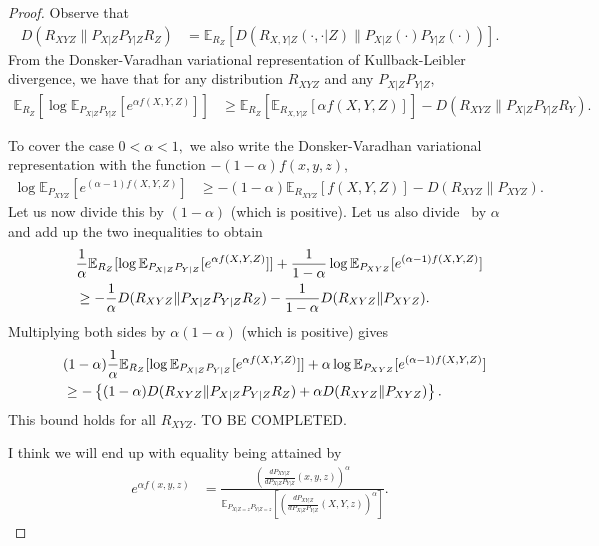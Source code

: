 \documentclass{article}
\numberwithin{theorem}{section}
\numberwithin{example}{section}
\numberwithin{remark}{section}
\numberwithin{definition}{section}
\newcommand{\E}{\mathbb{E}}
\begin{document}
\begin{proof}
    Observe that
\begin{align}
    D(R_{XYZ}\|P_{X|Z}P_{Y|Z}R_Z) &= \E_{R_Z}\left[ D(R_{X,Y|Z}(\cdot,\cdot|Z)\|P_{X|Z}(\cdot)P_{Y|Z}(\cdot))  \right].
\end{align}
From the Donsker-Varadhan variational representation of Kullback-Leibler divergence, we have that for any distribution $R_{XYZ}$ and any $P_{X|Z}P_{Y|Z},$
\begin{align}
    \E_{R_Z} [\log \E_{P_{X|Z}P_{Y|Z}}[e^{\alpha f(X,Y,Z)}]] & \ge \E_{R_Z} [\E_{R_{X,Y|Z}}[\alpha f(X,Y,Z)]] - D(R_{XYZ}\|P_{X|Z}P_{Y|Z}R_Y).\label{eq:proof-thm-Sibson-var-condZ-alternative-eq1}
\end{align}

To cover the case $0<\alpha<1,$ we also write the Donsker-Varadhan variational representation with the function $-(1-\alpha)f(x,y,z),$
\begin{align}
     \log \E_{P_{XYZ}}[e^{(\alpha-1) f(X,Y,Z)}] & \ge -(1-\alpha) \E_{R_{XYZ}}[ f(X,Y,Z)] - D(R_{XYZ}\|P_{XYZ}).
\end{align}
Let us now divide this by $(1-\alpha)$ (which is positive).
Let us also divide~ by $\alpha$
and add up the two inequalities to obtain
\begin{align}
 \lefteqn{  \frac{1}{\alpha}\E_{R_Z} [\log \E_{P_{X|Z}P_{Y|Z}}[e^{\alpha f(X,Y,Z)}]] + \frac{1}{1-\alpha} \log \E_{P_{XYZ}}[e^{(\alpha-1) f(X,Y,Z)}] } \nonumber\\
 & \ge  - \frac{1}{\alpha} D(R_{XYZ}\|P_{X|Z}P_{Y|Z}R_Z) - \frac{1}{1-\alpha} D(R_{XYZ}\|P_{XYZ}).
\end{align}
Multiplying both sides by $\alpha(1-\alpha)$ (which is positive) gives
\begin{align}
 \lefteqn{  (1-\alpha)\frac{1}{\alpha}\E_{R_Z} [\log \E_{P_{X|Z}P_{Y|Z}}[e^{\alpha f(X,Y,Z)}]] + \alpha \log \E_{P_{XYZ}}[e^{(\alpha-1) f(X,Y,Z)}] } \nonumber\\
 & \ge  - \left\{(1-\alpha) D(R_{XYZ}\|P_{X|Z}P_{Y|Z}R_Z) + \alpha D(R_{XYZ}\|P_{XYZ}) \right\}.
\end{align}
This bound holds for all $R_{XYZ}.$
TO BE COMPLETED.

I think we will end up with equality being attained by
\begin{align}
    e^{\alpha f(x,y,z)} & = \frac{\left(\frac{dP_{XY|Z}}{dP_{X|Z}P_{Y|Z}}(x,y,z)\right)^{\alpha}}{\E_{P_{X|Z=z}P_{Y|Z=z}}\left[\left(\frac{dP_{XY|Z}}{dP_{X|Z}P_{Y|Z}}(X,Y,z)\right)^{\alpha}\right] }. \label{eq:equalityVarRepr-condZ}
\end{align}
\end{proof}
\end{document}
